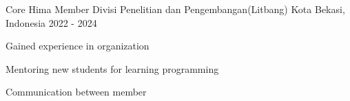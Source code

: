 

\begin{cventries}

  \cventry
    {Core Hima Member} %
    {Divisi Penelitian dan Pengembangan(Litbang)} %
    {Kota Bekasi, Indonesia} %
    {2022 - 2024} %
    {
      \begin{cvitems} %
        \item {Gained experience in organization}
        \item {Mentoring new students for learning programming}
        \item {Communication between member}
      \end{cvitems}
    }


\end{cventries}
